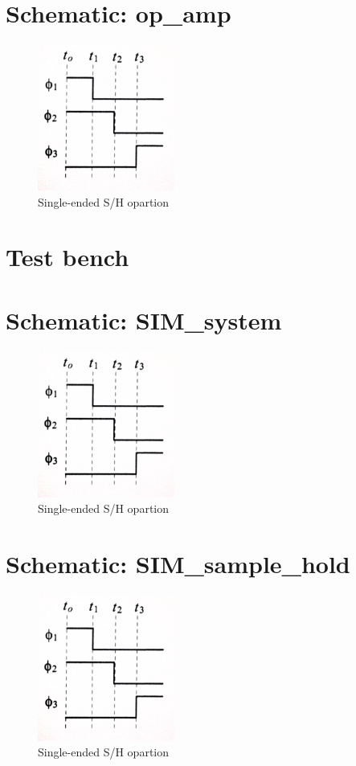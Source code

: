 \documentclass[english, a4paper,11pt]{article}
\begin{document}
\section*{Schematic: op\_amp}
\begin{figure}[!ht]
 \centering
   \includegraphics[width=0.4\textwidth]{img/timing_sample_hold.jpg}
   \caption{Single-ended S/H opartion \cite{CMOS-baker}}
   \label{timing}
\end{figure}

\section{Test bench}
\section*{Schematic: SIM\_system}
\begin{figure}[!ht]
 \centering
   \includegraphics[width=0.4\textwidth]{img/timing_sample_hold.jpg}
   \caption{Single-ended S/H opartion \cite{CMOS-baker}}
   \label{timing}
\end{figure}
\section*{Schematic: SIM\_sample\_hold}
\begin{figure}[!ht]
 \centering
   \includegraphics[width=0.4\textwidth]{img/timing_sample_hold.jpg}
   \caption{Single-ended S/H opartion \cite{CMOS-baker}}
   \label{timing}
\end{figure}
\end{document}
